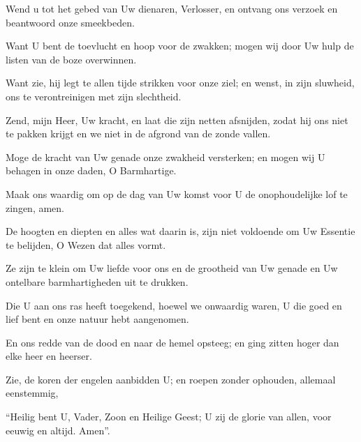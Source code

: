 \documentclass[12pt,twoside,a5paper]{article}
\begin{document}


\begin{halfparskip}

  Wend u tot het gebed van Uw dienaren, Verlosser, en ontvang ons verzoek en beantwoord onze smeekbeden.

  Want U bent de toevlucht en hoop voor de zwakken; mogen wij door Uw hulp de listen van de boze overwinnen.

  Want zie, hij legt te allen tijde strikken voor onze ziel; en wenst, in zijn sluwheid, ons te verontreinigen met zijn slechtheid.

  Zend, mijn Heer, Uw kracht, en laat die zijn netten afsnijden, zodat hij ons niet te pakken krijgt en we niet in de afgrond van de zonde vallen.

  Moge de kracht van Uw genade onze zwakheid versterken; en mogen wij U behagen in onze daden, O Barmhartige.

  Maak ons waardig om op de dag van Uw komst voor U de onophoudelijke lof te zingen, amen.
\end{halfparskip}

\begin{halfparskip}

  De hoogten en diepten en alles wat daarin is, zijn niet voldoende om Uw Essentie te belijden, O Wezen dat alles vormt.

  Ze zijn te klein om Uw liefde voor ons en de grootheid van Uw genade en Uw ontelbare barmhartigheden uit te drukken.

  Die U aan ons ras heeft toegekend, hoewel we onwaardig waren, U die goed en lief bent en onze natuur hebt aangenomen.

  En ons redde van de dood en naar de hemel opsteeg; en ging zitten hoger dan elke heer en heerser.

  Zie, de koren der engelen aanbidden U; en roepen zonder ophouden, allemaal eenstemmig,

  ``Heilig bent U, Vader, Zoon en Heilige Geest; U zij de glorie van allen, voor eeuwig en altijd. Amen''.
\end{halfparskip}
\end{document}
